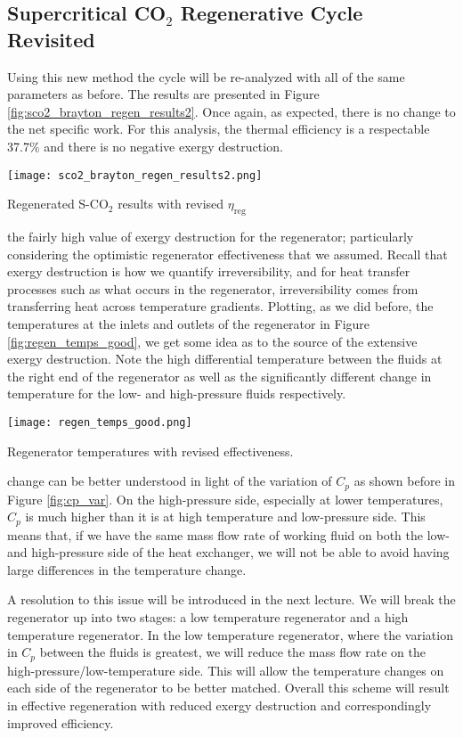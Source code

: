 \subsection{Supercritical CO$_{2}$ Regenerative Cycle Revisited}
Using this new method the cycle will be re-analyzed with all of the same parameters as before.  The results are presented in Figure \ref{fig:sco2_brayton_regen_results2}.  Once again, as expected, there is no change to the net specific work.  For this analysis, the thermal efficiency is a respectable 37.7\% and there is no negative exergy destruction.
\begin{marginfigure}
\texttt{[image: sco2\_brayton\_regen\_results2.png]}
\caption{Regenerated S-CO$_{2}$ results with revised $\eta_{\text{reg}}$}
\label{fig:sco2_brayton_regen_results2}
\end{marginfigure}  
 the fairly high value of exergy destruction for the regenerator; particularly considering the optimistic regenerator effectiveness that we assumed.  Recall that exergy destruction is how we quantify irreversibility, and for heat transfer processes such as what occurs in the regenerator, irreversibility comes from transferring heat across temperature gradients. Plotting, as we did before, the temperatures at the inlets and outlets of the regenerator in Figure \ref{fig:regen_temps_good}, we get some idea as to the source of the extensive exergy destruction. Note the high differential temperature between the fluids at the right end of the regenerator as well as the significantly different change in temperature for the low- and high-pressure fluids respectively.
\begin{marginfigure}
\texttt{[image: regen\_temps\_good.png]}
\caption{Regenerator temperatures with revised effectiveness.}
\label{fig:regen_temps_good}
\end{marginfigure}
 change can be better understood in light of the variation of $C_p$ as shown before in Figure \ref{fig:cp_var}. On the high-pressure side, especially at lower temperatures, $C_p$ is much higher than it is at high temperature and low-pressure side.  This means that, if we have the same mass flow rate of working fluid on both the low- and high-pressure side of the heat exchanger, we will not be able to avoid having large differences in the temperature change.

A resolution to this issue will be introduced in the next lecture.  We will break the regenerator up into two stages: a low temperature regenerator and a high temperature regenerator.  In the low temperature regenerator, where the variation in $C_p$ between the fluids is greatest, we will reduce the mass flow rate on the high-pressure/low-temperature side.  This will allow the temperature changes on each side of the regenerator to be better matched.  Overall this scheme will result in effective regeneration with reduced exergy destruction and correspondingly improved efficiency.

